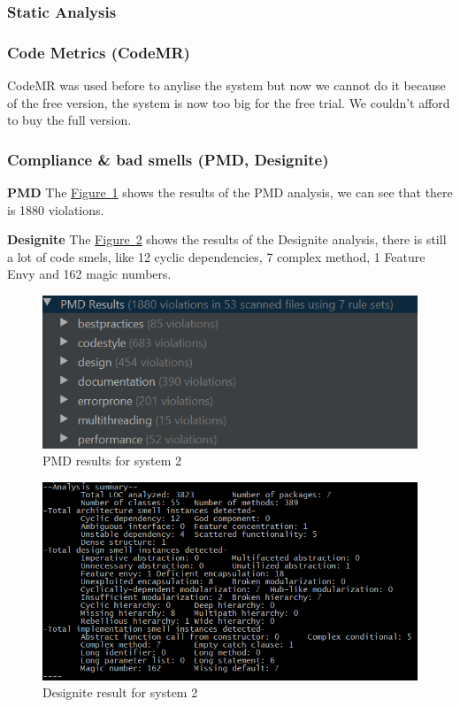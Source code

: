 \documentclass[]{article}
\newcommand{\wordlink}[2]{\hyperref[#2]{#1~\ref{#2}}}
\begin{document}
\subsubsection{Static Analysis}
\subsubsection{Code Metrics (CodeMR)}
  CodeMR was used before to anylise the system but now we cannot do it because of the free version, the system is now too big for the free trial. We couldn't afford to buy the full version.

\subsubsection{Compliance & bad smells (PMD, Designite)} 

\textbf{PMD} The \wordlink{Figure}{fig:pmd} shows the results of the PMD analysis, we can see that there is 1880 violations.

\textbf{Designite} The \wordlink{Figure}{fig:designite} shows the results of the Designite analysis, there is still a lot of code smels, like 12 cyclic dependencies, 7 complex method, 1 Feature Envy and 162 magic numbers.

\begin{figure}[h!]
\centering
\includegraphics[width=0.75\linewidth]{pmdFinal.png}
\caption{PMD results for system 2}
\label{fig:pmd}
\end{figure}

\begin{figure}[h!]
\centering
\includegraphics[width=0.75\linewidth]{designiteFinal.png}
\caption{Designite result for system 2}
\label{fig:designite}
\end{figure}
\end{document}
